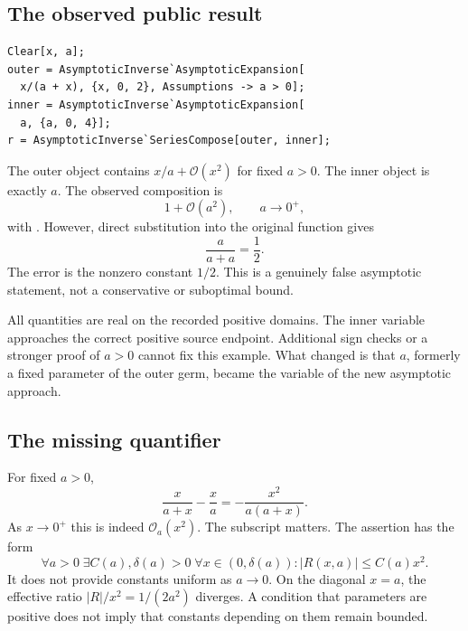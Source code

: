 \documentclass[11pt,letterpaper]{article}
\newcommand{\code}[1]{\texttt{\detokenize{#1}}}
\newcommand{\OO}{\mathcal O}
\begin{document}
\subsection{The observed public result}
\begin{lstlisting}
Clear[x, a];
outer = AsymptoticInverse`AsymptoticExpansion[
  x/(a + x), {x, 0, 2}, Assumptions -> a > 0];
inner = AsymptoticInverse`AsymptoticExpansion[
  a, {a, 0, 4}];
r = AsymptoticInverse`SeriesCompose[outer, inner];
\end{lstlisting}
The outer object contains $x/a+\OO(x^2)$ for fixed $a>0$. The inner object is exactly $a$. The observed composition is
\begin{equation}\label{eq:badcompose}
 1+\OO(a^2),\qquad a\to0^+,
\end{equation}
with \code{RemainderScaleExpression -> a^2}. However, direct substitution into the original function gives
\begin{equation}
 \frac{a}{a+a}=\frac12.
\end{equation}
The error is the nonzero constant $1/2$. This is a genuinely false asymptotic statement, not a conservative or suboptimal bound.

All quantities are real on the recorded positive domains. The inner variable approaches the correct positive source endpoint. Additional sign checks or a stronger proof of $a>0$ cannot fix this example. What changed is that $a$, formerly a fixed parameter of the outer germ, became the variable of the new asymptotic approach.

\subsection{The missing quantifier}
For fixed $a>0$,
\begin{equation}\label{eq:remainderexact}
 \frac{x}{a+x}-\frac{x}{a}=-\frac{x^2}{a(a+x)}.
\end{equation}
As $x\to0^+$ this is indeed $\OO_a(x^2)$. The subscript matters. The assertion has the form
\begin{equation}\label{eq:fixedquantifier}
 \forall a>0\;\exists C(a),\delta(a)>0\;\forall x\in(0,\delta(a)):
 |R(x,a)|\le C(a)x^2.
\end{equation}
It does not provide constants uniform as $a\to0$. On the diagonal $x=a$, the effective ratio $|R|/x^2=1/(2a^2)$ diverges. A condition that parameters are positive does not imply that constants depending on them remain bounded.
\end{document}
